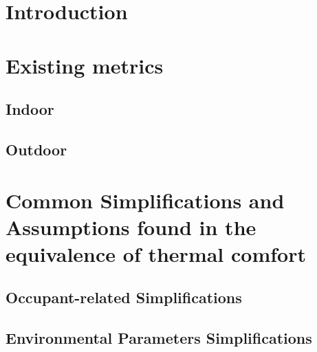\documentclass[review]{elsarticle}
\begin{document}
\section{Introduction}


\section{Existing metrics}
    \subsection{Indoor}
    
    \subsection{Outdoor} 
    

\section{Common Simplifications and Assumptions found in the equivalence of thermal comfort}
    \subsection{Occupant-related Simplifications}
    
    \subsection{Environmental Parameters Simplifications}
    
%         
%         
\end{document}
